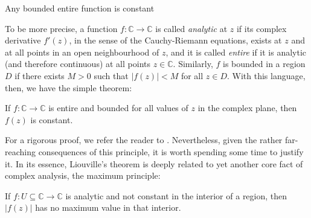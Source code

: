 \pagebreak

\begin{mathaside}{Any bounded entire function is constant}
\label{aside.entire-functions-bounded}


To be more precise, a function $f:\mathbb{C} \to \mathbb{C}$ is called \textit{analytic} at $z$ if its complex derivative $f'(z)$, in the sense of the Cauchy-Riemann equations, exists at $z$ and at all points in an open neighbourhood of $z$, and it is called \textit{entire} if it is analytic (and therefore continuous) at all points $z\in\mathbb{C}$. Similarly, $f$ is bounded in a region $D$ if there exists $M>0$ such that $|f(z)|<M$ for all $z\in D$. With this language, then, we have the simple theorem:

\begin{namedtheorem}[Liouville's]
If $f:\mathbb{C} \to \mathbb{C}$ is entire and bounded for all values of $z$ in the complex plane, then $f(z)$ is constant.
\end{namedtheorem}


For a rigorous proof, we refer the reader to . Nevertheless, given the rather far-reaching consequences of this principle, it is worth spending some time to justify it. In its essence, Liouville's theorem is deeply related to yet another core fact of complex analysis, the maximum principle:

\begin{theorem}
If $f:U\subseteq \mathbb{C}\to\mathbb{C}$ is analytic and not constant in the interior of a region, then $|f(z)|$ has no maximum value in that interior.
\end{theorem}



\end{mathaside}
